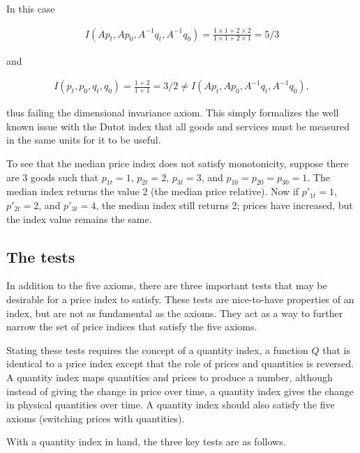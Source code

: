 \documentclass[]{article}
\begin{document}
In this case

\begin{align*}
I(Ap_{t}, Ap_{0}, A^{-1}q_{t}, A^{-1}q_{0}) = \frac{1 \times 1 + 2 \times 2}{1 \times 1 + 2 \times 1} = 5 / 3
\end{align*}

and

\begin{align*}
I(p_{t}, p_{0}, q_{t}, q_{0}) = \frac{1 + 2}{1 + 1} = 3 / 2 \neq I(Ap_{t}, Ap_{0}, A^{-1}q_{t}, A^{-1}q_{0}),
\end{align*}

thus failing the dimensional invariance axiom. This simply formalizes the well known issue with the Dutot index that all goods and services must be measured in the same units for it to be useful.

To see that the median price index does not satisfy monotonicity, suppose there are 3 goods such that \(p_{1t} = 1\), \(p_{2t} = 2\), \(p_{3t} = 3\), and \(p_{10} = p_{20} = p_{30} = 1\). The median index returns the value 2 (the median price relative). Now if \(p'_{1t} = 1\), \(p'_{2t} = 2\), and \(p'_{3t} = 4\), the median index still returns 2; prices have increased, but the index value remains the same.

\hypertarget{the-tests}{%
\subsection{The tests}\label{the-tests}}

In addition to the five axioms, there are three important tests that may be desirable for a price index to satisfy. These tests are nice-to-have properties of an index, but are not as fundamental as the axioms. They act as a way to further narrow the set of price indices that satisfy the five axioms.

Stating these tests requires the concept of a quantity index, a function \(Q\) that is identical to a price index except that the role of prices and quantities is reversed. A quantity index maps quantities and prices to produce a number, although instead of giving the change in price over time, a quantity index gives the change in physical quantities over time. A quantity index should also satisfy the five axioms (switching prices with quantities).

With a quantity index in hand, the three key tests are as follows.
\end{document}
